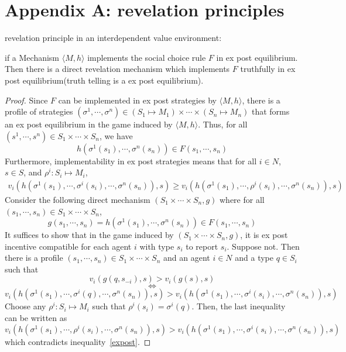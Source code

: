 
\chapter{Appendix A: revelation principles} %

\label{AppendixA} %
\begin{prop}
revelation principle in an interdependent value environment:

if a Mechanism $\langle M, h\rangle$ implements the social choice rule $F$ in ex post 
equilibrium. Then there is a direct revelation mechanism which implements $F$ truthfully in ex post equilibrium(truth telling is a ex
post equilibrium). 

\end{prop}
\begin{proof}
 Since $F$ can be implemented in ex post strategies by  $\langle M, h\rangle$, there is a profile of strategies $(\sigma^1,\cdots,
 \sigma^n)\in (S_1\mapsto M_1)\times \cdots\times (S_n\mapsto M_n)$ that forms an ex post equilibrium in the game induced by $\langle M, h\rangle$. Thus, for
 all $(s^1, \cdots,s^n)\in S_1\times \cdots\times S_n$, we have
 $$h(\sigma^1(s_1),\cdots,\sigma^n(s_n))\in F(s_1,\cdots,s_n)$$
 Furthermore, implementability in ex post strategies means that for all $i\in N$, $s\in S$, and $\rho^i:S_i\mapsto M_i$,
 \begin{align}\label{expost}
 v_i(h(\sigma^1(s_1),\cdots,\sigma^i(s_i),\cdots,\sigma^n(s_n)),s)\geqslant v_i(h(\sigma^1(s_1),\cdots,\rho^i(s_i),\cdots,\sigma^n(s_n)),s)
 \end{align}
Consider the following direct mechanism $(S_1\times\cdots\times S_n, g)$ where for all $(s_1,\cdots,s_n)\in S_1\times\cdots\times S_n$,
$$g(s_1,\cdots,s_n)=h(\sigma^1(s_1),\cdots,\sigma^n(s_n))\in F(s_1,\cdots,s_n)$$
It suffices to show that in the game induced by $(S_1\times\cdots\times S_n, g)$, it is ex post incentive compatible for each agent 
$i$ with type $s_i$ to report $s_i$. Suppose not. Then there is a profile $(s_1,\cdots,s_n)\in S_1\times\cdots\times S_n$ and an
agent $i\in N$ and a type $q\in S_i$ such that
$$v_i(g(q,s_{-i}),s)>v_i(g(s),s)$$
$$\Longleftrightarrow$$
$$v_i(h(\sigma^1(s_1),\cdots,\sigma^i(q),\cdots,\sigma^n(s_n)),s)>v_i(h(\sigma^1(s_1),\cdots,\sigma^i(s_i),\cdots,\sigma^n(s_n)),s)$$
Choose any $\rho^i:S_i\mapsto M_i$ such that $\rho^i(s_i)=\sigma^i(q)$. Then, the last inequality can be written as
$$v_i(h(\sigma^1(s_1),\cdots,\rho^i(s_i),\cdots,\sigma^n(s_n)),s)>v_i(h(\sigma^1(s_1),\cdots,\sigma^i(s_i),\cdots,\sigma^n(s_n)),s)$$
which contradicts inequality~\ref{expost}.
 \end{proof}